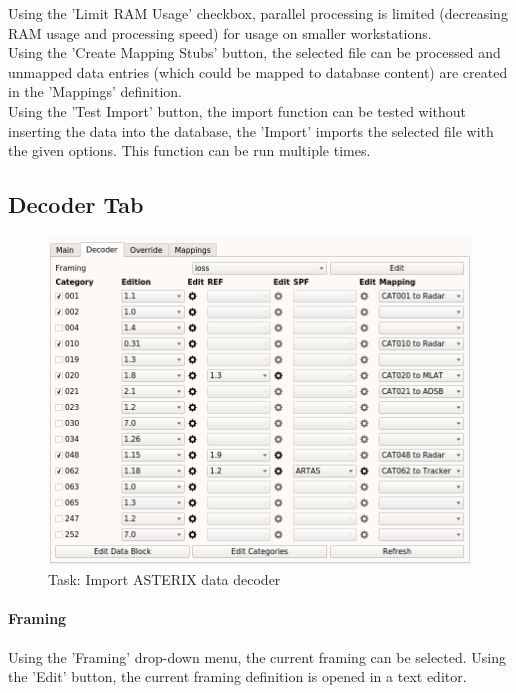 Using the 'Limit RAM Usage' checkbox, parallel processing is limited (decreasing RAM usage and processing speed) for usage on smaller workstations. \\

Using the 'Create Mapping Stubs' button, the selected file can be processed and unmapped data entries (which could be mapped to database content) are created in the 'Mappings' definition. \\

Using the 'Test Import' button, the import function can be tested without inserting the data into the 
database, the 'Import' imports the selected file with the given options. This function can be run multiple times. \\

\subsection{Decoder Tab}

\begin{figure}[H]
  \center
    \includegraphics[width=16cm,frame]{../screenshots/asterix_import_data_decoder.png}
  \caption{Task: Import ASTERIX data decoder}
\end{figure}

\paragraph{Framing}
Using the 'Framing' drop-down menu, the current framing can be selected. Using the 'Edit' button, the current framing definition is opened in a text editor.

